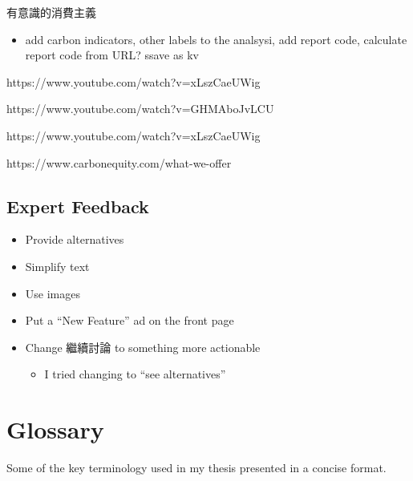 \documentclass[
  letterpaper,
  DIV=11,
  numbers=noendperiod]{scrartcl}
\providecommand{\tightlist}{%
  \setlength{\itemsep}{0pt}\setlength{\parskip}{0pt}}\usepackage{longtable,booktabs,array}
\begin{document}
有意識的消費主義

\begin{itemize}
\tightlist
\item
  add carbon indicators, other labels to the analsysi, add report code,
  calculate report code from URL? ssave as kv
\end{itemize}

https://www.youtube.com/watch?v=xLszCaeUWig

https://www.youtube.com/watch?v=GHMAboJvLCU

https://www.youtube.com/watch?v=xLszCaeUWig

https://www.carbonequity.com/what-we-offer

\subsection{Expert Feedback}\label{expert-feedback}

\begin{itemize}
\item
  Provide alternatives
\item
  Simplify text
\item
  Use images
\item
  Put a ``New Feature'' ad on the front page
\item
  Change 繼續討論 to something more actionable

  \begin{itemize}
  \tightlist
  \item
    I tried changing to ``see alternatives''
  \end{itemize}
\end{itemize}

\newpage

\section{Glossary}\label{glossary}

Some of the key terminology used in my thesis presented in a concise
format.
\end{document}
